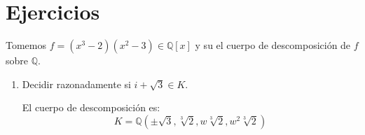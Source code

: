 \section{Ejercicios}
\begin{ejercicio} %
    Tomemos $f=(x^3-2)(x^2-3)\in \mathbb{Q}[x]$ y su el cuerpo de descomposición de $f$ sobre $\mathbb{Q}$.
    \begin{enumerate}
        \item Decidir razonadamente si $i+\sqrt{3}\in K$.

            El cuerpo de descomposición es:
            \begin{equation*}
                K = \mathbb{Q}\left(\pm\sqrt{3}, \sqrt[3]{2},w\sqrt[3]{2},w^2\sqrt[3]{2}\right)
            \end{equation*}


\end{enumerate}
\end{ejercicio}
